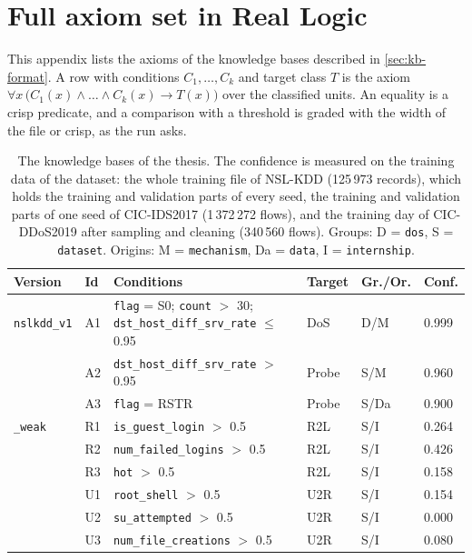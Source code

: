 \chapter{Full axiom set in Real Logic}
\label{app:axioms}

This appendix lists the axioms of the knowledge bases described in
\cref{sec:kb-format}. A row with conditions $C_1,\dots,C_k$ and target class $T$
is the axiom $\forall x\,\bigl(C_1(x)\wedge\dots\wedge C_k(x)\rightarrow
T(x)\bigr)$ over the classified units. An equality is a crisp predicate, and a
comparison with a threshold is graded with the width of the file or crisp, as the
run asks.

\begin{table}[htbp]
\centering
\footnotesize
\caption{The knowledge bases of the thesis. The confidence is measured on the
training data of the dataset: the whole training file of NSL-KDD (125\,973
records), which holds the training and validation parts of every seed, the training and validation parts of one seed of CIC-IDS2017
(1\,372\,272 flows), and the training day of CIC-DDoS2019 after sampling and
cleaning (340\,560 flows). Groups: D = \texttt{dos}, S = \texttt{dataset}.
Origins: M = \texttt{mechanism}, Da = \texttt{data}, I = \texttt{internship}.}
\label{tab:kb-versions}
\setlength{\tabcolsep}{3pt}
\begin{tabular}{@{}p{2.9cm}p{0.6cm}p{5.0cm}p{1.0cm}p{1.1cm}p{0.9cm}@{}}
\toprule
Version & Id & Conditions & Target & Gr./Or. & Conf. \\
\midrule
\texttt{nslkdd\_v1} & A1
  & \texttt{flag} = S0; \texttt{count} $>$ 30; \texttt{dst\_host\_diff\_srv\_rate} $\le$ 0.95
  & DoS & D/M & 0.999 \\
 & A2 & \texttt{dst\_host\_diff\_srv\_rate} $>$ 0.95 & Probe & S/M & 0.960 \\
 & A3 & \texttt{flag} = RSTR & Probe & S/Da & 0.900 \\
\texttt{\_weak} & R1 & \texttt{is\_guest\_login} $>$ 0.5 & R2L & S/I & 0.264 \\
 & R2 & \texttt{num\_failed\_logins} $>$ 0.5 & R2L & S/I & 0.426 \\
 & R3 & \texttt{hot} $>$ 0.5 & R2L & S/I & 0.158 \\
 & U1 & \texttt{root\_shell} $>$ 0.5 & U2R & S/I & 0.154 \\
 & U2 & \texttt{su\_attempted} $>$ 0.5 & U2R & S/I & 0.000 \\
 & U3 & \texttt{num\_file\_creations} $>$ 0.5 & U2R & S/I & 0.080 \\
\midrule

\end{tabular}
\end{table}

